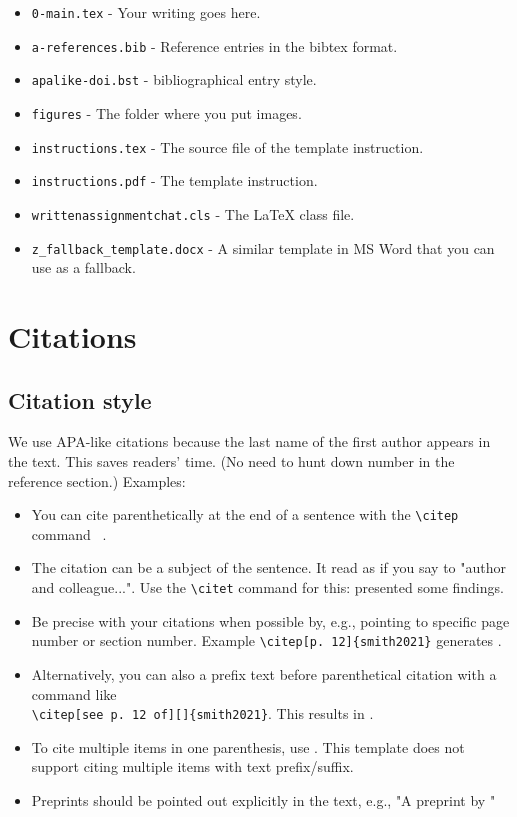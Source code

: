 \documentclass{writtenassignmentchat}
\begin{document}
\begin{itemize}
  \item \verb|0-main.tex| - Your writing goes here.
  \item \verb|a-references.bib| - Reference entries in the bibtex format.
  \item \verb|apalike-doi.bst| - bibliographical entry style.
  \item \verb|figures| - The folder where you put images.
  \item \verb|instructions.tex| - The source file of the template instruction.
  \item \verb|instructions.pdf| - The template instruction.
  \item \verb|writtenassignmentchat.cls| - The \LaTeX{} class file.
  \item \verb|z_fallback_template.docx| - A similar template in MS Word that you can use as a fallback.
\end{itemize}

\section{Citations}

\subsection{Citation style}

We use APA-like citations because the last name of the first author appears in the text. 
This saves readers' time. (No need to hunt down number in the reference section.)
Examples:
%
\begin{itemize}
  \item You can cite parenthetically at the end of a sentence with the \verb|\citep| command  ~\citep{smith2021}.
  \item The citation can be a subject of the sentence. It read as if you say to "author and colleague...". Use the \verb|\citet| command for this: \citet{brown2020} presented some findings.
  \item Be precise with your citations when possible by, e.g., pointing to specific page number or section number. Example \verb|\citep[p. 12]{smith2021}| generates \citep[p. 12]{smith2021}.
  \item Alternatively, you can also a prefix text before parenthetical citation with a command like\\ \verb|\citep[see p. 12 of][]{smith2021}|. This results in \citep[see p. 12 of][]{smith2021}. 
  \item To cite multiple items in one parenthesis, use \citep{smith2021, brown2020}. This template does not support citing multiple items with text prefix/suffix.
  \item Preprints should be pointed out explicitly in the text, e.g., "A preprint by \citet{doe2024preprint}"
\end{itemize}
%
\end{document}
